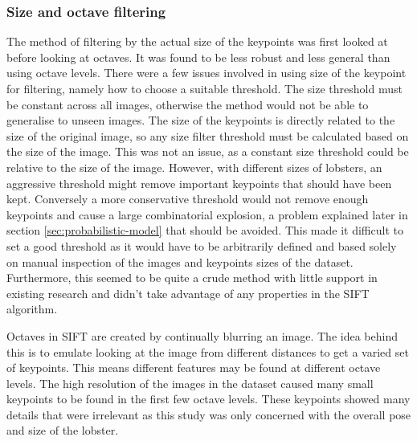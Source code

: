 \subsubsection{Size and octave filtering}
The method of filtering by the actual size of the keypoints was first looked at before looking at octaves. It was found to be less robust and less general than using octave levels. There were a few issues involved in using size of the keypoint for filtering, namely how to choose a suitable threshold. The size threshold must be constant across all images, otherwise the method would not be able to generalise to unseen images. The size of the keypoints is directly related to the size of the original image, so any size filter threshold must be calculated based on the size of the image. This was not an issue, as a constant size threshold could be relative to the size of the image. However, with different sizes of lobsters, an aggressive threshold might remove important keypoints that should have been kept. Conversely a more conservative threshold would not remove enough keypoints and cause a large combinatorial explosion, a problem explained later in section \ref{sec:probabilistic-model} that should be avoided. This made it difficult to set a good threshold as it would have to be arbitrarily defined and based solely on manual inspection of the images and keypoints sizes of the dataset. Furthermore, this seemed to be quite a crude method with little support in existing research and didn't take advantage of any properties in the SIFT algorithm. 

Octaves in SIFT are created by continually blurring an image. The idea behind this is to emulate looking at the image from different distances to get a varied set of keypoints. This means different features may be found at different octave levels. The high resolution of the images in the dataset caused many small keypoints to be found in the first few octave levels. These keypoints showed many details that were irrelevant as this study was only concerned with the overall pose and size of the lobster.

